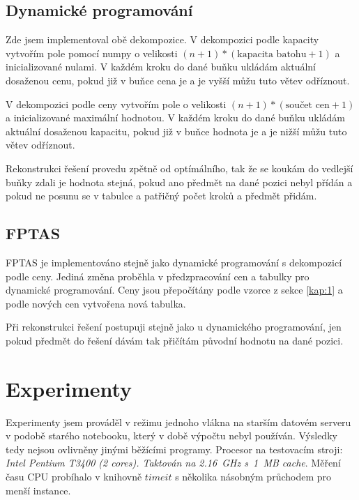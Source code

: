 \documentclass[11pt]{article}
\begin{document}
\subsection{Dynamické programování}
Zde jsem implementoval obě dekompozice. V dekompozici podle kapacity vytvořím pole pomocí numpy o velikosti $(n+1)*(\text{kapacita batohu} + 1)$ a inicializované nulami. V každém kroku do dané buňku ukládám aktuální dosaženou cenu, pokud již v buňce cena je a je vyšší můžu tuto větev odříznout.

V dekompozici podle ceny vytvořím pole o velikosti $(n+1)*(\text{součet cen} + 1)$ a inicializované maximální hodnotou. V každém kroku do dané buňku ukládám aktuální dosaženou kapacitu, pokud již v buňce hodnota je a je nižší můžu tuto větev odříznout.

Rekonstrukci řešení provedu zpětně od optímálního, tak že se koukám do vedlejší buňky zdali je hodnota stejná, pokud ano předmět na dané pozici nebyl přídán a pokud ne posunu se v tabulce a patřičný počet kroků a předmět přidám.

\subsection{FPTAS}
FPTAS je implementováno stejně jako dynamické programování s dekompozicí podle ceny. Jediná změna proběhla v předzpracování cen a tabulky pro dynamické programování. Ceny jsou přepočítány podle vzorce z sekce \ref{kap:1} a podle nových cen vytvořena nová tabulka. 

Při rekonstrukci řešení postupuji stejně jako u dynamického programování, jen pokud předmět do řešení dávám tak přičítám původní hodnotu na dané pozici.

\section{Experimenty}
 
Experimenty jsem prováděl v režimu jednoho vlákna na starším datovém serveru v podobě starého notebooku, který v době výpočtu nebyl používán. Výsledky tedy nejsou ovlivněny jinými běžícími programy. Procesor na testovacím stroji: \textit{Intel Pentium T3400 (2 cores). Taktován na 2.16~GHz s~1~MB cache}.
Měření času CPU probíhalo v knihovně $timeit$ s několika násobným průchodem pro menší instance.
\end{document}
